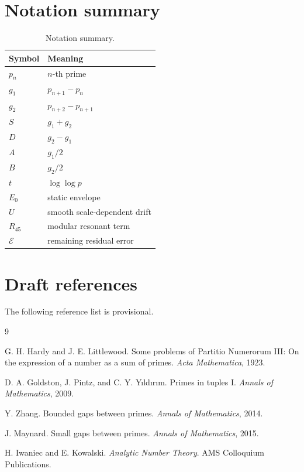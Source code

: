 \documentclass[11pt]{article}
\begin{document}
\section{Notation summary}

\begin{table}[htbp]
\centering
\begin{tabular}{ll}
\toprule
Symbol & Meaning\\
\midrule
\(p_n\) & \(n\)-th prime\\
\(g_1\) & \(p_{n+1}-p_n\)\\
\(g_2\) & \(p_{n+2}-p_{n+1}\)\\
\(S\) & \(g_1+g_2\)\\
\(D\) & \(g_2-g_1\)\\
\(A\) & \(g_1/2\)\\
\(B\) & \(g_2/2\)\\
\(t\) & \(\log\log p\)\\
\(E_0\) & static envelope\\
\(U\) & smooth scale-dependent drift\\
\(R_{45}\) & modular resonant term\\
\(\mathcal{E}\) & remaining residual error\\
\bottomrule
\end{tabular}
\caption{Notation summary.}
\end{table}

\section{Draft references}

The following reference list is provisional.

\begin{thebibliography}{9}

G. H. Hardy and J. E. Littlewood.
\newblock Some problems of Partitio Numerorum III: On the expression of a number as a sum of primes.
\newblock \emph{Acta Mathematica}, 1923.

D. A. Goldston, J. Pintz, and C. Y. Y\i{}ld\i{}r\i{}m.
\newblock Primes in tuples I.
\newblock \emph{Annals of Mathematics}, 2009.

Y. Zhang.
\newblock Bounded gaps between primes.
\newblock \emph{Annals of Mathematics}, 2014.

J. Maynard.
\newblock Small gaps between primes.
\newblock \emph{Annals of Mathematics}, 2015.

H. Iwaniec and E. Kowalski.
\newblock \emph{Analytic Number Theory}.
\newblock AMS Colloquium Publications.

\end{thebibliography}
\end{document}
